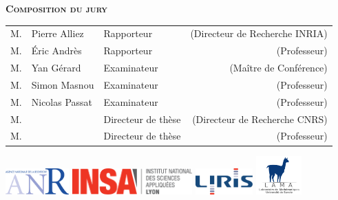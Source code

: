 \begin{titlepage}
\begin{addmargin}[-3.5cm]{-3cm}
\begin{center}
        \textbf{\textsc{Composition du jury}}\\ \medskip

        \begin{table}[h]
	\begin{tabular}{@{}lllr@{}}
	\hline
	M. & Pierre Alliez  & Rapporteur  & (Directeur de Recherche INRIA) \\
	M. & Éric Andrès 	  & Rapporteur  & (Professeur) \\
	M. & Yan Gérard     & Examinateur & (Maître de Conférence) \\
	M. & Simon Masnou   & Examinateur & (Professeur) \\
	M. & Nicolas Passat & Examinateur & (Professeur) \\
	M. & \thesisFirstSupervisor & Directeur de thèse & (Directeur de Recherche CNRS) \\
	M. & \thesisSecondSupervisor & Directeur de thèse & (Professeur) \\
	\end{tabular}
	\end{table}

	{
	\includegraphics[height=1cm]{gfx/Logo_ANR}
	\includegraphics[height=1cm]{gfx/Logo_INSALyon}
	\includegraphics[height=1cm]{gfx/Logo_LIRIS}
	\includegraphics[height=1.5cm]{gfx/Logo_LAMA}
	}

    \end{center}
  \end{addmargin}
\end{titlepage}
